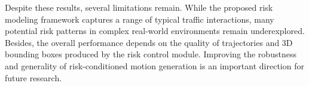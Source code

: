 \documentclass{article}
\begin{document}
Despite these results, several limitations remain. While the proposed risk modeling framework captures a range of typical traffic interactions, many potential risk patterns in complex real-world environments remain underexplored. Besides, the overall performance depends on the quality of trajectories and 3D bounding boxes produced by the risk control module. Improving the robustness and generality of risk-conditioned motion generation is an important direction for future research.




\end{document}
